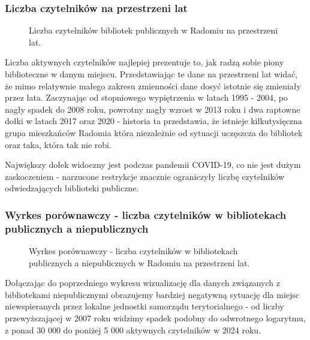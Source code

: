 \documentclass[12pt]{article}
\begin{document}
\subsubsection{Liczba czytelników na przestrzeni lat}
\begin{figure}[H]
    
    \caption{Liczba czytelników bibliotek publicznych w Radomiu na przestrzeni lat.}
\end{figure}

Liczba aktywnych czytelników najlepiej prezentuje to, jak radzą sobie piony biblioteczne w danym miejscu. Przedstawiając te dane na 
przestrzeni lat widać, że mimo relatywnie małego zakresu zmienności dane dosyć istotnie się zmieniały przez lata. Zaczynając od stopniowego
wypiętrzenia w latach 1995 - 2004, po nagły spadek do 2008 roku, powrotny nagły wzrost w 2013 roku i dwa raptowne dołki w latach 2017 
oraz 2020 - historia ta przedstawia, że istnieje kilkutysięczna grupa mieszkańców Radomia która niezależnie od sytuacji uczęszcza do 
bibliotek oraz taka, która tak nie robi.

Największy dołek widoczny jest podczas pandemii COVID-19, co nie jest dużym zaskoczeniem - narzucone restrykcje znacznie ograniczyły liczbę
czytelników odwiedzających biblioteki publiczne.

\subsubsection{Wyrkes porównawczy - liczba czytelników w bibliotekach publicznych a niepublicznych}
\begin{figure}[H]
    
    \caption{Wyrkes porównawczy - liczba czytelników w bibliotekach publicznych a niepublicznych w Radomiu na przestrzeni lat.}
\end{figure}

Dołączając do poprzedniego wykresu wizualizację dla danych związanych z bibliotekami niepublicznymi obrazujemy bardziej negatywną sytuację
dla miejsc niewspieranych przez lokalne jednostki samorządu terytorialnego - od liczby przewyższającej w 2007 roku widzimy spadek 
podobny do odwrotnego logarytmu, z ponad 30 000 do poniżej 5 000 aktywnych czytelników w 2024 roku. 

%     
\end{document}
